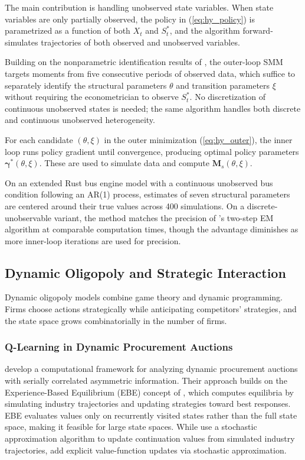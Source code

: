 The main contribution is handling unobserved state variables. When state variables are only partially observed, the policy in (\ref{eq:hy_policy}) is parametrized as a function of both $X_t$ and $S_t^*$, and the algorithm forward-simulates trajectories of both observed and unobserved variables.

Building on the nonparametric identification results of \citet{HuShum2012}, the outer-loop SMM targets moments from five consecutive periods of observed data, which suffice to separately identify the structural parameters $\theta$ and transition parameters $\xi$ without requiring the econometrician to observe $S_t^*$. No discretization of continuous unobserved states is needed; the same algorithm handles both discrete and continuous unobserved heterogeneity.

For each candidate $(\theta, \xi)$ in the outer minimization (\ref{eq:hy_outer}), the inner loop runs policy gradient until convergence, producing optimal policy parameters $\boldsymbol{\gamma}^*(\theta, \xi)$. These are used to simulate data and compute $\mathbf{M}_s(\theta, \xi)$.

On an extended Rust bus engine model with a continuous unobserved bus condition following an AR(1) process, estimates of seven structural parameters are centered around their true values across 400 simulations. On a discrete-unobservable variant, the method matches the precision of \citet{ArcidiaconoMiller2011}'s two-step EM algorithm at comparable computation times, though the advantage diminishes as more inner-loop iterations are used for precision.


\subsection{Dynamic Oligopoly and Strategic Interaction}

Dynamic oligopoly models combine game theory and dynamic programming. Firms choose actions strategically while anticipating competitors' strategies, and the state space grows combinatorially in the number of firms.


\subsubsection{Q-Learning in Dynamic Procurement Auctions}

\citet{AskerEtAl2020} develop a computational framework for analyzing dynamic procurement auctions with serially correlated asymmetric information. Their approach builds on the Experience-Based Equilibrium (EBE) concept of \citet{FershtmanPakes2012}, which computes equilibria by simulating industry trajectories and updating strategies toward best responses. EBE evaluates values only on recurrently visited states rather than the full state space, making it feasible for large state spaces. While \citet{FershtmanPakes2012} use a stochastic approximation algorithm to update continuation values from simulated industry trajectories, \citet{AskerEtAl2020} add explicit value-function updates via stochastic approximation.

